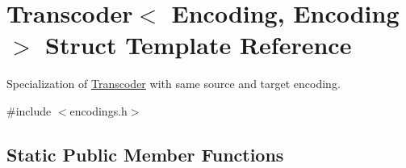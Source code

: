 \hypertarget{structTranscoder_3_01Encoding_00_01Encoding_01_4}{}\section{Transcoder$<$ Encoding, Encoding $>$ Struct Template Reference}
\label{structTranscoder_3_01Encoding_00_01Encoding_01_4}


Specialization of \hyperlink{structTranscoder}{Transcoder} with same source and target encoding.  




{\ttfamily \#include $<$encodings.\+h$>$}

\subsection*{Static Public Member Functions}
